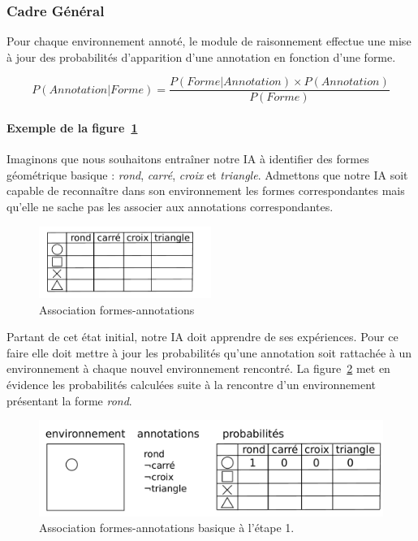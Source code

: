 \subsubsection{Cadre Général}

Pour chaque environnement annoté, le module de raisonnement effectue une mise à jour des probabilités d'apparition d'une annotation en fonction d'une forme.

\[ P(Annotation|Forme) = \frac{P(Forme|Annotation) \times P(Annotation)}{P(Forme)} \]

\paragraph{Exemple de la figure~\ref{img_annotations}}
Imaginons que nous souhaitons entraîner notre IA à identifier des formes géométrique basique : \emph{rond}, \emph{carré}, \emph{croix} et \emph{triangle}. Admettons que notre IA soit capable de reconnaître dans son environnement les formes correspondantes mais qu'elle ne sache pas les associer aux annotations correspondantes.

\begin{figure}[H] 
\centering
    \includegraphics[width=0.5\textwidth]{files/raisonneur/annotations} 
\caption{Association formes-annotations} 
\label{img_annotations}
\end{figure}

Partant de cet état initial, notre IA doit apprendre de ses expériences. Pour ce faire elle doit mettre à jour les probabilités qu'une annotation soit rattachée à un environnement à chaque nouvel environnement rencontré. La figure~\ref{img_annotations_1} met en évidence les probabilités calculées suite à la rencontre d'un environnement présentant la forme \emph{rond}.

\begin{figure}[H] 
\centering
\includegraphics[width=\textwidth]{files/raisonneur/annotations_1} 
\caption{Association formes-annotations basique à l'étape 1.} 
\label{img_annotations_1}
\end{figure}

